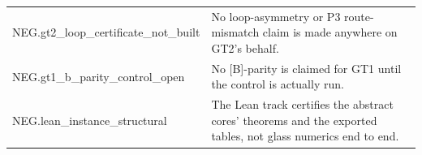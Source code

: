 \begin{longtable}{>{\raggedright\arraybackslash}p{3.6cm}p{11.6cm}}
NEG.\allowbreak{}gt2\_\allowbreak{}loop\_\allowbreak{}certificate\_\allowbreak{}not\_\allowbreak{}built & No loop-asymmetry or P3 route-mismatch claim is made anywhere on GT2's behalf. \\
NEG.\allowbreak{}gt1\_\allowbreak{}b\_\allowbreak{}parity\_\allowbreak{}control\_\allowbreak{}open & No [B]-parity is claimed for GT1 until the control is actually run. \\
NEG.\allowbreak{}lean\_\allowbreak{}instance\_\allowbreak{}structural & The Lean track certifies the abstract cores' theorems and the exported tables, not glass numerics end to end. \\
\bottomrule
\end{longtable}
